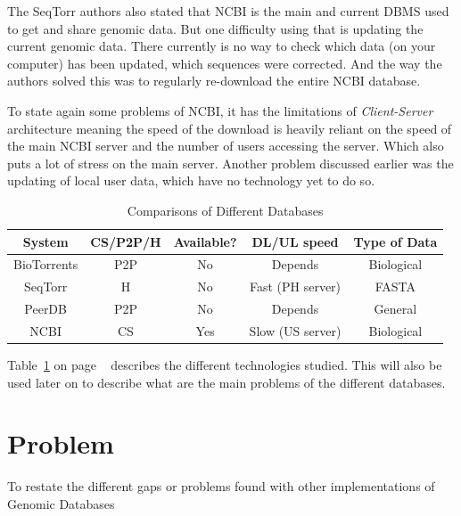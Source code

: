 \documentclass[acmsmall]{acmart}
\begin{document}
The SeqTorr authors\cite{seqtorr} also stated that NCBI is the main and current DBMS used to get and share genomic data. But one difficulty using that is updating the current genomic data. There currently is no way to check which data (on your computer) has been updated, which sequences were corrected. And the way the authors solved this was to regularly re-download the entire NCBI database.

To state again some problems of NCBI, it has the limitations of \textit{Client-Server} architecture meaning the speed of the download is heavily reliant on the speed of the main NCBI server and the number of users accessing the server. Which also puts a lot of stress on the main server. Another problem discussed earlier was the updating of local user data, which have no technology yet to do so.


\begin{table}[h]
    \caption{Comparisons of Different Databases}
    \label{table:database_comparison_table}
    \begin{tabular}{ccccc}
    \toprule
    System      & CS/P2P/H & Available? & DL/UL speed & Type of Data \\ 
    \midrule
    BioTorrents & P2P           & No         & Depends                    & Biological  \\ 
    SeqTorr     & H             & No         & Fast (PH server)           & FASTA        \\ 
    PeerDB      & P2P           & No         & Depends                    & General      \\ 
    NCBI        & CS            & Yes        & Slow (US server)           & Biological  \\ 
    \bottomrule
    \end{tabular}
\end{table} 

Table~\ref{table:database_comparison_table} on page ~\pageref{table:database_comparison_table} describes the different technologies studied. This will also be used later on to describe what are the main problems of the different databases.

\section{Problem}
To restate the different gaps or problems found with other implementations of Genomic Databases
\end{document}
